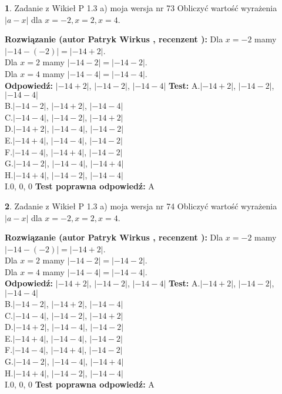 \documentclass[12pt, a4paper]{article}
\theoremstyle{definition} %
\newtheorem{zad}{}
\newcommand{\zadStart}[1]{\begin{zad}#1\newline}
\newcommand{\zadStop}{\end{zad}}
\newcommand{\rozwStart}[2]{\noindent \textbf{Rozwiązanie (autor #1 , recenzent #2): }\newline}
\newcommand{\rozwStop}{\newline}
\newcommand{\odpStart}{\noindent \textbf{Odpowiedź:}\newline}
\newcommand{\odpStop}{\newline}
\newcommand{\testStart}{\noindent \textbf{Test:}\newline}
\newcommand{\testStop}{\newline}
\newcommand{\kluczStart}{\noindent \textbf{Test poprawna odpowiedź:}\newline}
\newcommand{\kluczStop}{\newline}
\begin{document}
\zadStart{Zadanie z Wikieł P 1.3 a) moja wersja nr 73}
Obliczyć wartość wyrażenia $|a - x|$ dla $x=-2,x=2,x=4$.
\zadStop
\rozwStart{Patryk Wirkus}{}
Dla $x = -2$ mamy $|-14 - (-2)| = |-14 + 2|$.\\
Dla $x = 2$ mamy $|-14 - 2| = |-14 - 2|$.\\
Dla $x = 4$ mamy $|-14 - 4| = |-14 - 4|$.\\
\rozwStop
\odpStart
$|-14 + 2|$, $|-14 - 2|$, $|-14 - 4|$
\odpStop
\testStart
A.$|-14 + 2|$, $|-14 - 2|$, $|-14 - 4|$\\
B.$|-14 - 2|$, $|-14 + 2|$, $|-14 - 4|$\\
C.$|-14 - 4|$, $|-14 - 2|$, $|-14 + 2|$\\
D.$|-14 + 2|$, $|-14 - 4|$, $|-14 - 2|$\\
E.$|-14 + 4|$, $|-14 - 4|$, $|-14 - 2|$\\
F.$|-14 - 4|$, $|-14 + 4|$, $|-14 - 2|$\\
G.$|-14 - 2|$, $|-14 - 4|$, $|-14 + 4|$\\
H.$|-14 + 4|$, $|-14 - 2|$, $|-14 - 4|$\\
I.$0$, $0$, $0$
\testStop
\kluczStart
A
\kluczStop



\zadStart{Zadanie z Wikieł P 1.3 a) moja wersja nr 74}
Obliczyć wartość wyrażenia $|a - x|$ dla $x=-2,x=2,x=4$.
\zadStop
\rozwStart{Patryk Wirkus}{}
Dla $x = -2$ mamy $|-14 - (-2)| = |-14 + 2|$.\\
Dla $x = 2$ mamy $|-14 - 2| = |-14 - 2|$.\\
Dla $x = 4$ mamy $|-14 - 4| = |-14 - 4|$.\\
\rozwStop
\odpStart
$|-14 + 2|$, $|-14 - 2|$, $|-14 - 4|$
\odpStop
\testStart
A.$|-14 + 2|$, $|-14 - 2|$, $|-14 - 4|$\\
B.$|-14 - 2|$, $|-14 + 2|$, $|-14 - 4|$\\
C.$|-14 - 4|$, $|-14 - 2|$, $|-14 + 2|$\\
D.$|-14 + 2|$, $|-14 - 4|$, $|-14 - 2|$\\
E.$|-14 + 4|$, $|-14 - 4|$, $|-14 - 2|$\\
F.$|-14 - 4|$, $|-14 + 4|$, $|-14 - 2|$\\
G.$|-14 - 2|$, $|-14 - 4|$, $|-14 + 4|$\\
H.$|-14 + 4|$, $|-14 - 2|$, $|-14 - 4|$\\
I.$0$, $0$, $0$
\testStop
\kluczStart
A
\kluczStop
\end{document}
